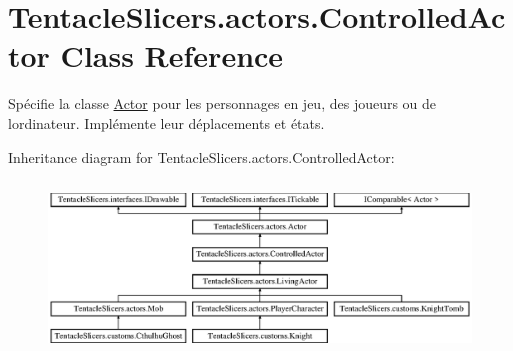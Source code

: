 \hypertarget{class_tentacle_slicers_1_1actors_1_1_controlled_actor}{}\section{Tentacle\+Slicers.\+actors.\+Controlled\+Actor Class Reference}
\label{class_tentacle_slicers_1_1actors_1_1_controlled_actor}


Spécifie la classe \hyperlink{class_tentacle_slicers_1_1actors_1_1_actor}{Actor} pour les personnages en jeu, des joueurs ou de l\textquotesingle{}ordinateur. Implémente leur déplacements et états.  


Inheritance diagram for Tentacle\+Slicers.\+actors.\+Controlled\+Actor\+:\begin{figure}[H]
\begin{center}
\leavevmode
\includegraphics[height=4.590164cm]{class_tentacle_slicers_1_1actors_1_1_controlled_actor}
\end{center}
\end{figure}
